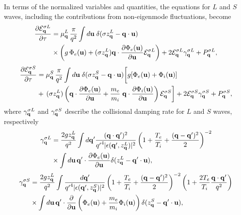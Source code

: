 \documentclass[12pt,a4paper,ruledheader]{report}
\def\calE{{\cal E}}
\begin{document}
In terms of the normalized variables and quantities, the equations
for $L$ and $S$ waves, including the contributions from non-eigenmode
fluctuations, become
\begin{equation}
  \begin{split}
    \frac{\partial\calE_{\bf q}^{\sigma L}}{\partial\tau}
  &=\mu_{\bf q}^L\,\frac{\pi}{q^2}\int d{\bf u}\;
    \delta(\sigma z_{\bf q}^L-{\bf q}\cdot{\bf u})\\
    &\times\biggl(g\,\Phi_e({\bf u})+(\sigma z_{\bf q}^L)
    {\bf q}\cdot\frac{\partial \Phi_e({\bf u})}{\partial{\bf u}}
    \calE_{\bf q}^{\sigma L}\biggr)
    +2\calE_{\bf q}^{\sigma L}\gamma_{\bf q}^{\sigma L}+P_{\bf q}^{\sigma L},
      \end{split}
 \label{EpsL}
\end{equation}
\begin{equation}
  \begin{split}
    \frac{\partial{\cal E}_{\bf q}^{\sigma S}}{\partial \tau}
  &=\mu_{\bf q}^S\,\frac{\pi}{q^2}
    \int d{\bf u}\;
    \delta(\sigma z_{\bf q}^S-{\bf q}\cdot{\bf u})
    \biggl[g[\Phi_e({\bf u})+\Phi_i({\bf u})]\\
    &+\,(\sigma z_{\bf q}^L)\,\biggl({\bf q}\cdot
    \frac{\partial \Phi_e({\bf u})}{\partial{\bf u}}
    +\frac{m_e}{m_i}\;{\bf q}\cdot
    \frac{\partial \Phi_i({\bf u})}{\partial{\bf u}}\biggr)
    \,\calE_{\bf q}^{\sigma S}\biggr]
    +2\calE_{\bf q}^{\sigma S}\gamma_{\bf q}^{\sigma S}+P_{\bf q}^{\sigma S},
\end{split}
 \label{EpsS}
\end{equation}
where $\gamma_{\bf q}^{\sigma L}$ and $\gamma_{\bf q}^{\sigma S}$ describe
the collisional damping rate for $L$ and $S$ waves, respectively
\begin{equation}
  \label{GqL}
  \begin{split}
    \gamma_{\bf q}^{\sigma L}&=
    \frac{2gz_{\bf q}^L}{q^2}\int d{\bf q}'
    \frac{({\bf q}\cdot {\bf q'})^2}{{q'}^4
    |\epsilon({\bf q'},z_{\bf q}^L)|^2}
    \left(1+\frac{T_e}{T_i}
    +\frac{({\bf q}-{\bf q'})^2}{2}\right)^{-2}\\
  &\times\int d{\bf u}\,{\bf q'}\cdot
    \frac{\partial \Phi_e({\bf u})}{\partial {\bf u}}
    \delta(z_{\bf q}^L-{\bf q'}\cdot{\bf u}),
  \end{split}
\end{equation}
\begin{equation}
  \label{GqS}
  \begin{split}
    \gamma_{\bf q}^{\sigma S}
    &=\frac{2gz_{\bf q}^L}{q^2}
    \int\frac{d{\bf q}'}{{q'}^4|\epsilon({\bf q'},z_{\bf q}^S)|^2}
    \left(1+\frac{T_e}{T_i}+\frac{({\bf q}-{\bf q'})^2}{2}\right)^{-2}
    \left(1+\frac{2T_e}{T_i}\frac{{\bf q}\cdot{\bf q}'}{q^2}\right)\\
  &\times \int d{\bf u}\, {\bf q'}
    \cdot\frac{\partial}{\partial {\bf u}}
    \left(\Phi_e({\bf u})+\frac{m_e}{m_i}
    \Phi_i({\bf u})\right)\delta(z_{\bf q}^S
    -{\bf q'}\cdot{\bf u}),
  \end{split}
\end{equation}
\end{document}
